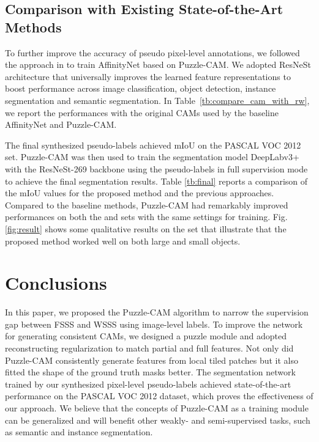 \documentclass{article}
\begin{document}
\subsection{Comparison with Existing State-of-the-Art Methods}
\label{ssec:comparisons}

To further improve the accuracy of pseudo pixel-level annotations, we followed the approach in \cite{ahn2018learning} to train AffinityNet based on Puzzle-CAM. 
We adopted ResNeSt architecture that universally improves the learned feature representations to boost performance across image classification, object detection, instance segmentation and semantic segmentation. 
In Table~\ref{tb:compare_cam_with_rw}, we report the performances with the original CAMs used by the baseline AffinityNet \cite{ahn2018learning} and Puzzle-CAM.

The final synthesized pseudo-labels achieved  mIoU on the PASCAL VOC 2012  set.
Puzzle-CAM was then used to train the segmentation model DeepLabv3+ \cite{chen2018encoder} with the ResNeSt-269 \cite{zhang2020resnest} backbone using the pseudo-labels in full supervision mode to achieve the final segmentation results. 
Table \ref{tb:final} reports a comparison of the mIoU values for the proposed method and the previous approaches. 
Compared to the baseline methods, Puzzle-CAM had remarkably improved performances on both the  and  sets with the same settings for training.
Fig. \ref{fig:result} shows some qualitative results on the  set that illustrate that the proposed method worked well on both large and small objects.








\section{Conclusions}
\label{sec:conclusion}

In this paper, we proposed the Puzzle-CAM algorithm to narrow the supervision gap between FSSS and WSSS using image-level labels. 
To improve the network for generating consistent CAMs, we designed a puzzle module and adopted reconstructing regularization to match partial and full features.
Not only did Puzzle-CAM consistently generate features from local tiled patches but it also fitted the shape of the ground truth masks better. 
The segmentation network trained by our synthesized pixel-level pseudo-labels achieved state-of-the-art performance on the PASCAL VOC 2012 dataset, which proves the effectiveness of our approach. 
We believe that the concepts of Puzzle-CAM as a training module can be generalized and will benefit other weakly- and semi-supervised tasks, such as semantic and instance segmentation.
\end{document}
